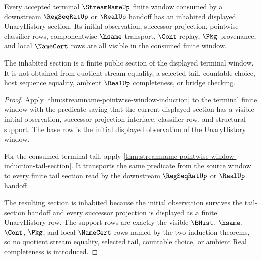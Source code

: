 \begin{theorem}
\label{thm:streamname-terminal-window-inhabited-section}
Every accepted terminal $\StreamNameUp$ finite window consumed by a downstream $\RegSeqRatUp$ or $\RealUp$ handoff has an inhabited displayed UnaryHistory section. Its initial observation, successor projection, pointwise classifier rows, componentwise $\hsame$ transport, $\Cont$ replay, $\Pkg$ provenance, and local $\NameCert$ rows are all visible in the consumed finite window.

The inhabited section is a finite public section of the displayed terminal window. It is not obtained from quotient stream equality, a selected tail, countable choice, host sequence equality, ambient $\RealUp$ completeness, or bridge checking.
\end{theorem}
\begin{proof}
Apply \autoref{thm:streamname-pointwise-window-induction} to the terminal finite window with the predicate saying that the current displayed section has a visible initial observation, successor projection interface, classifier row, and structural support. The base row is the initial displayed observation of the UnaryHistory window.

For the consumed terminal tail, apply \autoref{thm:streamname-pointwise-window-induction-tail-section}. It transports the same predicate from the source window to every finite tail section read by the downstream $\RegSeqRatUp$ or $\RealUp$ handoff.

The resulting section is inhabited because the initial observation survives the tail-section handoff and every successor projection is displayed as a finite UnaryHistory row. The support rows are exactly the visible $\BHist$, $\hsame$, $\Cont$, $\Pkg$, and local $\NameCert$ rows named by the two induction theorems, so no quotient stream equality, selected tail, countable choice, or ambient Real completeness is introduced.
\end{proof}
